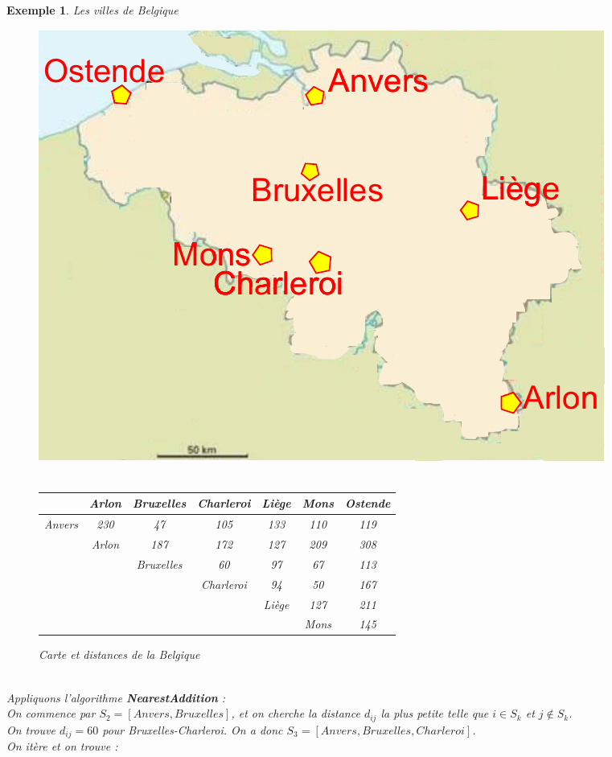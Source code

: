 \documentclass{article}
\newtheorem{exemple}{Exemple}[section]
\begin{document}
\begin{sffamily}
\begin{exemple}Les villes de Belgique\\
\begin{figure}[h!]
    \begin{center}
    \includegraphics[scale=0.5]{belgique.pdf}$ $\\$ $\\
    \begin{tabular}{r|c|c|c|c|c|c|}
	 & Arlon & Bruxelles & Charleroi & Liège & Mons & Ostende \\
	\hline
	Anvers & 230 & 47 & 105 & 133 & 110 & 119 \\
	& Arlon & 187 & 172 & 127 & 209 & 308 \\
	& & Bruxelles & 60 & 97 & 67 & 113 \\
	& & & Charleroi & 94 & 50 & 167 \\
	& & & & Liège & 127 & 211 \\
	& & & & & Mons & 145
	\end{tabular}
    \caption{Carte et distances de la Belgique}
    \end{center}
\end{figure}
$ $\\
Appliquons l'algorithme \textbf{NearestAddition} : \\
On commence par $S_2 = [Anvers,Bruxelles]$, et on cherche la distance $d_{ij}$ la plus petite telle que $i\in S_k$ et $j \not\in S_k$.\\
On trouve $d_{ij} = 60$ pour Bruxelles-Charleroi. On a donc $S_3 = [Anvers,Bruxelles,Charleroi]$.\\
On itère et on trouve :

\end{exemple}
\end{sffamily}
\end{document}
